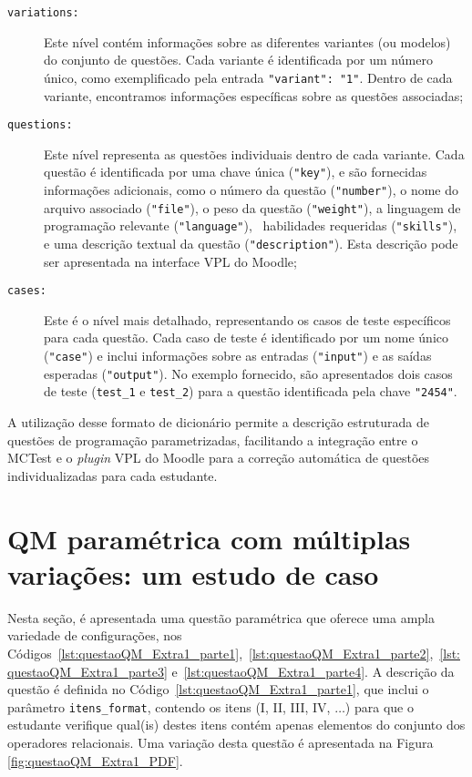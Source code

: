 \begin{description}
\item[\texttt{variations:}]  Este nível contém informações sobre as diferentes variantes (ou modelos) do conjunto de questões. Cada variante é identificada por um número único, como exemplificado pela entrada \verb|"variant": "1"|. Dentro de cada variante, encontramos informações específicas sobre as questões associadas;

\item[\texttt{questions:}] Este nível representa as questões individuais dentro de cada variante. Cada questão é identificada por uma chave única (\verb|"key"|), e são fornecidas informações adicionais, como o número da questão (\verb|"number"|), o nome do arquivo associado (\verb|"file"|), o peso da questão (\verb|"weight"|), a linguagem de programação relevante (\verb|"language"|), \ habilidades requeridas (\verb|"skills"|), e uma descrição textual da questão (\verb|"description"|). Esta descrição pode ser apresentada na interface VPL do Moodle;

\item[\texttt{cases:}] Este é o nível mais detalhado, representando os casos de teste específicos para cada questão. Cada caso de teste é identificado por um nome único (\verb|"case"|) e inclui informações sobre as entradas (\verb|"input"|) e as saídas esperadas (\verb|"output"|). No exemplo fornecido, são apresentados dois casos de teste (\verb|test_1| e \verb|test_2|) para a questão identificada pela chave \verb|"2454"|.
\end{description}

A utilização desse formato de dicionário permite a descrição estruturada de questões de programação parametrizadas, facilitando a integração entre o MCTest e o \textit{plugin} VPL do Moodle para a correção automática de questões individualizadas para cada estudante.

\section{QM paramétrica com múltiplas variações: um estudo de caso}\label{sec:QMparametricaExtra}

Nesta seção, é apresentada uma questão paramétrica que oferece uma ampla variedade de configurações, nos Códigos~\ref{lst:questaoQM_Extra1_parte1},~\ref{lst:questaoQM_Extra1_parte2},~\ref{lst:questaoQM_Extra1_parte3} e~\ref{lst:questaoQM_Extra1_parte4}.
%
A descrição da questão é definida no Código~\ref{lst:questaoQM_Extra1_parte1}, que inclui o parâmetro \verb|itens_format|, contendo os itens (I, II, III, IV, \(\ldots\)) para que o estudante verifique qual(is) destes itens contém apenas elementos do conjunto dos operadores relacionais. Uma variação desta questão é apresentada na Figura \ref{fig:questaoQM_Extra1_PDF}.

